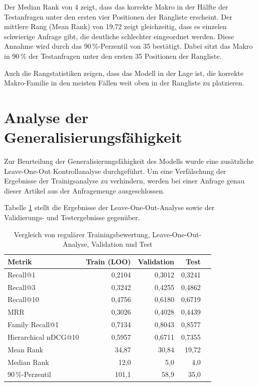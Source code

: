 Der Median Rank von 4 zeigt, dass das korrekte Makro \parencite{EPLAN-Makros} in der Hälfte der Testanfragen unter den ersten vier Positionen der Rangliste erscheint.
Der mittlere Rang (Mean Rank) von 19,72 zeigt gleichzeitig, dass es einzelen schwierige Anfrage gibt, die deutliche schlechter eingeordnet werden.
Diese Annahme wird durch das 90\,\%-Perzentil von 35 bestätigt. Dabei sitzt das Makro \parencite{EPLAN-Makros} in 90\,\% der Testanfragen unter den ersten 35 Positionen der Rangliste.

Auch die Rangstatistiken zeigen, dass das Modell in der Lage ist, die korrekte Makro-Familie in den meisten Fällen weit oben in der Rangliste zu platzieren.

\section{Analyse der Generalisierungsfähigkeit}

Zur Beurteilung der Generalisierungsfähigkeit des Modells wurde eine zusätzliche Leave-One-Out Kontrollanalyse durchgeführt. 
Um eine Verfälschung der Ergebnisse der Trainigsanalyse zu verhindern, werden bei einer Anfrage genau dieser Artikel aus der Anfragemenge ausgeschlossen.


Tabelle \ref{tab:loo_vergleich} stellt die Ergebnisse der Leave-One-Out-Analyse sowie der Validierungs- und Testergebnisse gegenüber.

\begin{table}[tbp] 
  \centering 
  \caption{Vergleich von regulärer Trainingsbewertung, Leave-One-Out-Analyse, Validation und Test} 
  \label{tab:loo_vergleich} 
  \begin{tabular}{lrrrr} 
    \toprule 
    \textbf{Metrik} & \textbf{Train (LOO)} & \textbf{Validation} & \textbf{Test} \\ 
    \midrule 
    Recall@1 &  0,2104 & 0,3012 & 0,3241 \\ 
    Recall@3 & 0,3242 & 0,4255 & 0,4862 \\ 
    Recall@10 & 0,4756 & 0,6180 & 0,6719 \\ 
    MRR & 0,3026 & 0,4028 & 0,4439 \\ 
    Family Recall@1 & 0,7134 & 0,8043 & 0,8577 \\ 
    Hierarchical nDCG@10 & 0,5957 & 0,6711 & 0,7355 \\ 
    Mean Rank & 34,87 & 30,84 & 19,72 \\ 
    Median Rank & 12,0 & 5,0 & 4,0 \\ 
    90\,\%-Perzentil & 101,1 & 58,9 & 35,0 \\ 
    \bottomrule 
    \end{tabular} 
    \end{table}


